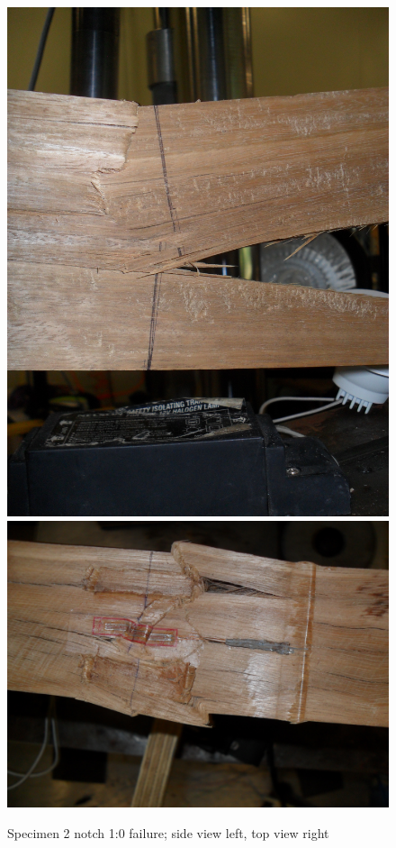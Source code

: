 \documentclass[11pt,a4paper]{article}
\numberwithin{equation}{subsection}
\begin{document}
\begin{figure}[h]
	\begin{center}
		\includegraphics[scale=0.05]{Spec_2_flex}
		\includegraphics[scale=0.086]{Spec_2_Top}
	\end{center}
	\caption{Specimen 2 notch 1:0 failure; side view left, top view right}
	\label{fig:Spec_2}
\end{figure}
\end{document}
